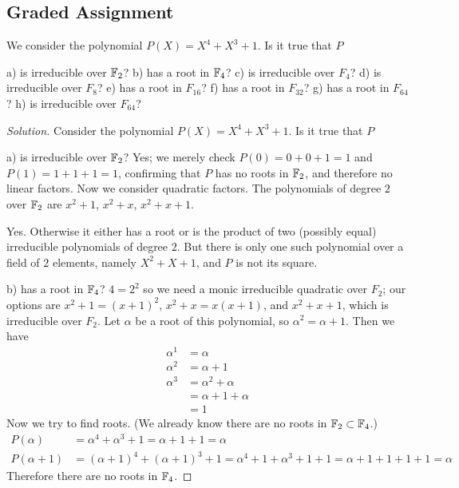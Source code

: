 \subsection{Graded Assignment}

\begin{que}
We consider the polynomial $P(X)=X^4 + X^3 + 1$. Is it true that $P$

a) is irreducible over $\mathbb{F}_2$? 
b) has a root in $\mathbb{F}_4$? 
c) is irreducible over $F_4$? 
d) is irreducible over $F_8$? 
e) has a root in $F_16$? 
f) has a root in $F_32$? 
g) has a root in $F_64$? 
h) is irreducible over $F_64$?
\end{que}
\begin{proof}[Solution]
Consider the polynomial $P(X) = X^4 + X^3 + 1$. Is it true that $P$

a) is irreducible over $\mathbb{F}_2$?
Yes; we merely check $P(0) = 0 + 0 + 1 = 1$ and $P(1) = 1 + 1 + 1 = 1$, confirming that $P$ has no roots in $\mathbb{F}_2$, and therefore no linear factors. Now we consider quadratic factors. The polynomials of degree $2$ over $\mathbb{F}_2$ are $x^2 + 1$, $x^2 + x$, $x^2 + x + 1$.

{\color{blue} Yes. Otherwise it either has a root or is the product of two (possibly equal) irreducible polynomials of degree $2$. But there is only one such polynomial over a field of $2$ elements, namely $X^2 + X + 1$, and $P$ is not its square.}

b) has a root in $\mathbb{F}_4$?
$4 = 2^2$ so we need a monic irreducible quadratic over $F_2$; our options are $x^2 + 1 = (x + 1)^2$, $x^2 + x = x(x + 1)$, and $x^2 + x + 1$, which is irreducible over $F_2$. Let $\alpha$ be a root of this polynomial, so $\alpha^2 = \alpha + 1$. Then we have 
\begin{align*}
\alpha^1 &= \alpha\\
\alpha^2 &= \alpha + 1\\
\alpha^3 &= \alpha^2 + \alpha\\
         &= \alpha + 1 + \alpha\\
         &= 1
\end{align*}
Now we try to find roots. (We already know there are no roots in $\mathbb{F}_2 \subset \mathbb{F}_4$.)
\begin{align*}
P(\alpha)   &= \alpha^4 + \alpha^3 + 1 = \alpha + 1 + 1 = \alpha\\
P(\alpha + 1) &= (\alpha + 1)^4 + (\alpha + 1)^3 + 1 = \alpha^4 + 1 + \alpha^3 + 1 + 1 = \alpha + 1 + 1 + 1 + 1 = \alpha
\end{align*}
Therefore there are no roots in $\mathbb{F}_4$.


\end{proof}
